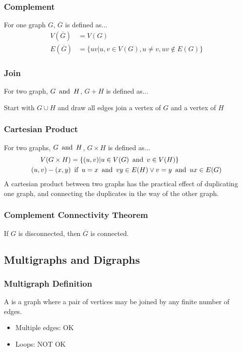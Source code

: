\subsubsection*{Complement}
For one graph $G$, $\overline{G}$ is defined as...
\begin{align*}
    V(\overline{G}) & = V(G)                                            \\
    E(\overline{G}) & = \{uv | u,v \in V(G), u \neq v, uv \notin E(G)\}
\end{align*}

\subsubsection*{Join}
For two graph, $G \operatorname{~\text{and}~} H$, $G + H$ is defined as...
\begin{center}
    Start with $G \cup H$ and draw all edges join a vertex of $G$ and a vertex of $H$
\end{center}

\subsubsection*{Cartesian Product}
For two graphs, $G \operatorname{~\text{and}~} H$, $G \times H$ is defined as...
\begin{align*}
    V(G \times H) & = \{(u,v) | u \in V(G) \operatorname{~\text{and}~} v \in V(H)\}                 \\
    (u,v)-(x,y)   & \operatorname{~\text{if}~} u = x \operatorname{~\text{and}~} vy \in E(H) \lor v = y \operatorname{~\text{and}~} ux \in E(G)
\end{align*}
A cartesian product between two graphs has the practical effect of duplicating one graph, and connecting the duplicates in the way of the other graph.

\subsubsection*{Complement Connectivity Theorem}
If $G$ is disconnected, then $\overline{G}$ is connected.

\subsection{Multigraphs and Digraphs}

\subsubsection*{Multigraph Definition}
A  is a graph where a pair of vertices may be joined by any finite number of edges.
\begin{itemize}
    \item Multiple edges: OK
    \item Loops: NOT OK
\end{itemize}

